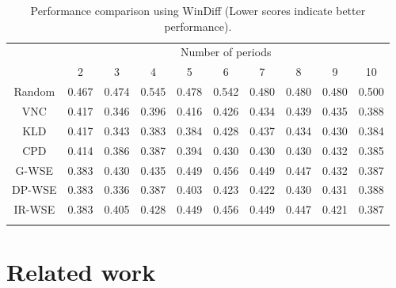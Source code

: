 \documentclass[output=paper]{langsci/langscibook}
\begin{document}
\begin{table}
\small
\caption{Performance comparison using WinDiff (Lower scores indicate better performance).}
\label{windiff}
\centering
\begin{tabular}{cccccccccc}
\lsptoprule
\multirow{2}{*}{Acronym} & \multicolumn{9}{c}{Number of periods}                                                                                                                 \\ \cmidrule(lr){2-10} 
                                                                                       &2                                   & 3              & 4              & 5              & 6              & 7              & 8              & 9              & 10             \\ \midrule
Random                   & 0.467                               & 0.474          & 0.545          & 0.478          & 0.542          & 0.480          & 0.480          & 0.480          & 0.500          \\ VNC                      & 0.417                               & 0.346          & 0.396          & 0.416          & 0.426          & 0.434          & 0.439          & 0.435          & 0.388          \\KLD              & 0.417                               & 0.343          & 0.383          & 0.384 & 0.428          & 0.437          & 0.434          & 0.430         & 0.384         \\CPD                 & 0.414                               & 0.386          & 0.387          & 0.394          & 0.430          & 0.430          & 0.430          & 0.432          & 0.385          \\ 
G-WSE                   & 0.383                      & 0.430          & 0.435          & 0.449          & 0.456          & 0.449          & 0.447          & 0.432          & 0.387          \\ DP-WSE                  & 0.383                      & 0.336 & 0.387          & 0.403          & 0.423 & 0.422 & 0.430          & 0.431          & 0.388          \\IR-WSE                  & 0.383                  & 0.405          & 0.428          & 0.449          & 0.456          & 0.449          & 0.447          & 0.421 & 0.387          \\ \lspbottomrule
\end{tabular}
\end{table}
\section{Related work}
\end{document}

